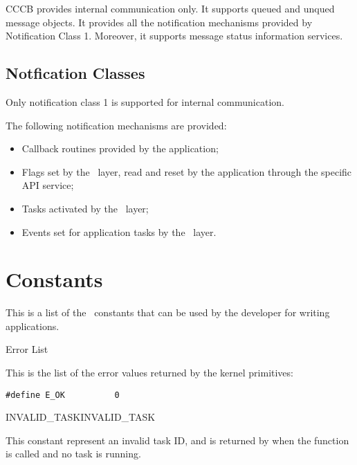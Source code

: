 CCCB provides internal communication only. It supports queued and unqued message objects. It provides all the notification mechanisms provided by Notification Class 1. Moreover, it supports message status information services.




\subsection{Notfication Classes}
Only notification class 1 is supported for internal communication. 

The following notification mechanisms are provided:
\begin{itemize}
\item Callback routines provided by the application;
\item Flags set by the \oc\ layer, read and reset by the application through the specific API service;
\item Tasks activated by the \oc\ layer;
\item Events set for application tasks by the \oc\ layer.
\end{itemize}


\pagebreak

\section{Constants}
\label{sec:constants}

This is a list of the \ee\ constants that can be used by the developer
for writing applications.

\begin{constant}{Error List}
  \begin{constantdescription}
    This is the list of the error values returned by the kernel primitives:
    \begin {lstlisting}
#define E_OK          0
    \end{lstlisting}
  \end{constantdescription}
\end{constant}

\begin{constant2}{INVALID\_TASK}{INVALID_TASK}
  \begin{constantdescription}
    This constant represent an invalid task ID, and is returned by
     when the function is called and no task is
    running.
  \end{constantdescription}
\end{constant2}

